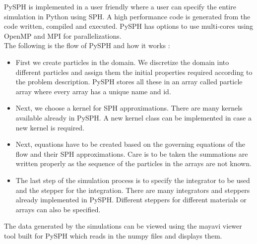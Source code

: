 PySPH is implemented in a user friendly where a user can specify the entire simulation in Python using SPH. A high performance code is generated from the code written, compiled and executed. PySPH has options to use multi-cores using OpenMP and MPI for parallelizations.\\



The following is the flow of PySPH and how it works \citep{janmejaya}:

\begin{itemize}
 \item First we create particles in the domain. We discretize the domain into different particles and assign them the initial properties required according to the problem description. PySPH stores all these in an array called particle array where every array has a unique name and id.
 \item Next, we choose a kernel for SPH approximations. There are many kernels available already in PySPH. A new kernel class can be implemented in case a new kernel is required.
 \item Next, equations have to be created based on the governing equations of the flow and their SPH approximations. Care is to be taken the summations are written properly as the sequence of the particles in the arrays are not known.
 \item The last step of the simulation process is to specify the integrator to be used and the stepper for the integration. There are many integrators and steppers already implemented in PySPH. Different steppers for different materials or arrays can also be specified.
\end{itemize}

The data generated by the simulations can be viewed using the mayavi viewer tool built for PySPH which reads in the numpy files and displays them.

